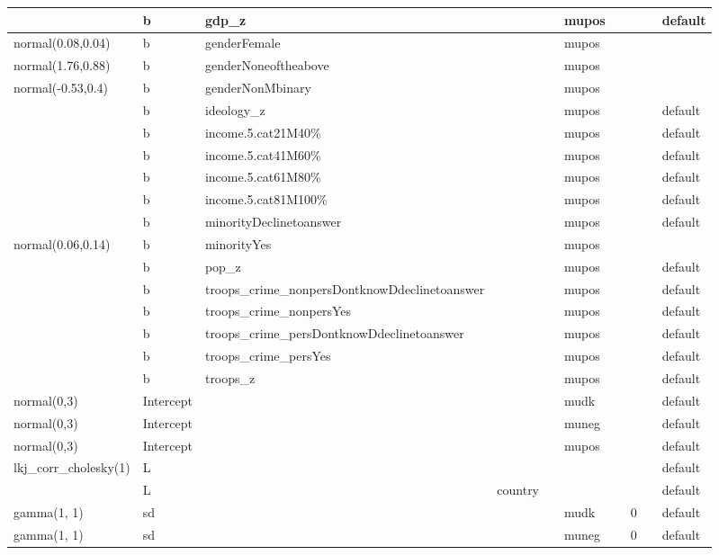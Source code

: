 \documentclass[
]{book}
\theoremstyle{definition}
\theoremstyle{definition}
\theoremstyle{definition}
\theoremstyle{definition}
\theoremstyle{remark}
\begin{document}
\begin{table}
\begin{tabular}[t]{l|l|l|l|l|l|l|l|l|l}
\hline
 & b & gdp\_z &  &  & mupos &  &  &  & default\\
\hline
normal(0.08,0.04) & b & genderFemale &  &  & mupos &  &  &  & \\
\hline
normal(1.76,0.88) & b & genderNoneoftheabove &  &  & mupos &  &  &  & \\
\hline
normal(-0.53,0.4) & b & genderNonMbinary &  &  & mupos &  &  &  & \\
\hline
 & b & ideology\_z &  &  & mupos &  &  &  & default\\
\hline
 & b & income.5.cat21M40\% &  &  & mupos &  &  &  & default\\
\hline
 & b & income.5.cat41M60\% &  &  & mupos &  &  &  & default\\
\hline
 & b & income.5.cat61M80\% &  &  & mupos &  &  &  & default\\
\hline
 & b & income.5.cat81M100\% &  &  & mupos &  &  &  & default\\
\hline
 & b & minorityDeclinetoanswer &  &  & mupos &  &  &  & default\\
\hline
normal(0.06,0.14) & b & minorityYes &  &  & mupos &  &  &  & \\
\hline
 & b & pop\_z &  &  & mupos &  &  &  & default\\
\hline
 & b & troops\_crime\_nonpersDontknowDdeclinetoanswer &  &  & mupos &  &  &  & default\\
\hline
 & b & troops\_crime\_nonpersYes &  &  & mupos &  &  &  & default\\
\hline
 & b & troops\_crime\_persDontknowDdeclinetoanswer &  &  & mupos &  &  &  & default\\
\hline
 & b & troops\_crime\_persYes &  &  & mupos &  &  &  & default\\
\hline
 & b & troops\_z &  &  & mupos &  &  &  & default\\
\hline
normal(0,3) & Intercept &  &  &  & mudk &  &  &  & default\\
\hline
normal(0,3) & Intercept &  &  &  & muneg &  &  &  & default\\
\hline
normal(0,3) & Intercept &  &  &  & mupos &  &  &  & default\\
\hline
lkj\_corr\_cholesky(1) & L &  &  &  &  &  &  &  & default\\
\hline
 & L &  & country &  &  &  &  &  & default\\
\hline
gamma(1, 1) & sd &  &  &  & mudk &  & 0 &  & default\\
\hline
gamma(1, 1) & sd &  &  &  & muneg &  & 0 &  & default\\

\end{tabular}
\end{table}
\end{document}
